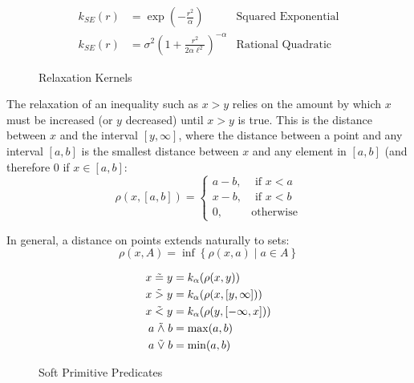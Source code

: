 \begin{figure}\label{kernels}
\begin{align*}
k_{SE}(r) &= \exp\left(-\frac{r^2}{\alpha}\right) & \text{Squared Exponential}\\
k_{SE}(r) &= \sigma^2\left(1 + \frac{r^2}{2 \alpha \ell^2}\right)^{-\alpha} & \text{Rational Quadratic}
\end{align*}
\caption{Relaxation Kernels}
\end{figure}

The relaxation of an inequality such as $x > y$ relies on the amount by which $x$ must be increased (or $y$ decreased) until $x > y$ is true.
This is the distance between $x$ and the interval $[y, \infty]$, where the distance between a point and any interval $[a, b]$ is the smallest distance between $x$ and any element in $[a, b]$ (and therefore 0 if $x \in [a, b]$:
\begin{equation}
\rho(x, [a, b]) =
\begin{cases}
  a - b, & \text{ if } x < a\\
  x - b, & \text{ if } x < b\\
  0,              & \text{otherwise}
\end{cases}
\end{equation}

In general, a distance on points extends naturally to sets:
\begin{equation}
\rho(x, A) = \inf \left\{\rho(x, a) \mid a \in A\right\}
\end{equation}




\begin{figure}\label{softpreds}
  \begin{align*}
x \mathrel{\tilde{=}} y &= k_\alpha(\rho(x, y))\\
x \mathrel{\tilde{>}} y &= k_\alpha(\rho(x, [y, \infty]))\\
x \mathrel{\tilde{<}} y &= k_\alpha(\rho(y, [-\infty, x]))\\
a \mathrel{\tilde{\land}} b &= \max(a, b)\\
a \mathrel{\tilde{\lor}} b &= \min(a, b)
  \end{align*}
\caption{Soft Primitive Predicates}
\end{figure}

